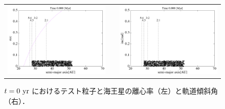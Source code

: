 \documentclass[11pt,a4paper,oneside,onecolumn]{jreport}
\begin{document}
\begin{figure}[H]
\begin{tabular}{ccc}
\begin{minipage}[t]{0.45\hsize}
\centering
\includegraphics[width=8cm]{./image/kuiper_ecc_0yr.pdf}
\end{minipage} &
\begin{minipage}[t]{0.1\hsize}
\end{minipage} &
\begin{minipage}[t]{0.45\hsize}
\centering
\includegraphics[width=8cm]{./image/kuiper_inc_0yr.pdf}
\end{minipage}\\
%
\end{tabular}
\caption{$t = 0\ {\rm yr}$ におけるテスト粒子と海王星の離心率（左）と軌道傾斜角（右）．\label{fig:kuiper_ecc_inc_0yr}}
\end{figure}
\end{document}
